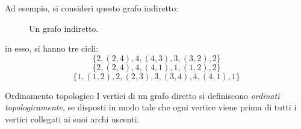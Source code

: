 \documentclass[a4paper, 12pt]{report}
\begin{document}
    \begin{example}
        Ad esempio, si consideri questo grafo indiretto:

        \begin{figure}[H]
            \centering
            \caption{Un grafo indiretto.}
        \end{figure}

        in esso, si hanno tre cicli: $$\{2, (2, 4), 4, (4,3), 3, (3, 2), 2\}$$ $$\{2, (2, 4), 4, (4, 1), 1, (1, 2), 2\}$$ $$\{1, (1, 2), 2, (2, 3), 3, (3, 4), 4, (4, 1), 1\}$$
    \end{example}

    \begin{frameddefn}{Ordinamento topologico}
        I vertici di un grafo diretto si definiscono \textit{ordinati topologicamente}, se disposti in modo tale che ogni vertice viene prima di tutti i vertici collegati ai suoi archi uscenti.
    \end{frameddefn}
\end{document}

